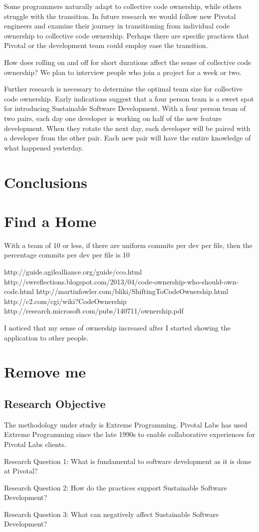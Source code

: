 Some programmers naturally adapt to collective code ownership, while others struggle with the transition. In future research we would follow new Pivotal engineers and examine their journey in transitioning from individual code ownership to collective code ownership. Perhaps there are 
specific practices that Pivotal or the development team could employ ease the transition. 

How does rolling on and off for short durations affect the sense of collective code ownership? We plan to interview people who join a project for a week or two. 



Further research is necessary to determine the optimal team size for collective code ownership. Early indications suggest that a four person team is a sweet spot for introducing Sustainable Software Development. With a four person team of two pairs, each day one developer is working on half of the new feature development. When they rotate the next day, each developer will be paired with a developer from the other pair. Each new pair will have the entire knowledge of what happened yesterday. 


\section{Conclusions}

\section{Find a Home}

With a team of 10 or less, if there are uniform commits per dev per file, then the percentage commits per dev per file is 10%

http://guide.agilealliance.org/guide/cco.html  
http://swreflections.blogspot.com/2013/04/code-ownership-who-should-own-code.html
http://martinfowler.com/bliki/ShiftingToCodeOwnership.html
http://c2.com/cgi/wiki?CodeOwnership
http://research.microsoft.com/pubs/140711/ownership.pdf

I noticed that my sense of ownership increased after I started showing the application to other people.



\section{Remove me}
\subsection{Research Objective}
The methodology under study is Extreme Programming. \cite{ExtremeProgramming2004} Pivotal Labs has used Extreme Programming since the late 1990s to enable collaborative experiences for Pivotal Labs clients.


Research Question 1: What is fundamental to software development as it is done at Pivotal? 

Research Question 2: How do the practices support Sustainable Software Development? 

Research Question 3: What can negatively affect Sustainable Software Development?





